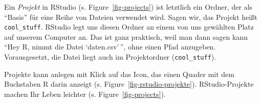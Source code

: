 \documentclass[
  letterpaper,
  DIV=11,
  numbers=noendperiod]{scrartcl}
\theoremstyle{definition}
\theoremstyle{definition}
\theoremstyle{definition}
\theoremstyle{remark}
\begin{document}
Ein \emph{Projekt} in RStudio (s. Figure~\ref{fig-projects}) ist
letztlich ein Ordner, der als ``Basis'' für eine Reihe von Dateien
verwendet wird. Sagen wir, das Projekt heißt \texttt{cool\_stuff}.
RStudio legt uns diesen Ordner an einem von uns gewählten Platz auf
unserem Computer an. Das ist ganz praktisch, weil man dann sagen kann
``Hey R, nimmt die Datei `daten.csv'\,'', ohne einen Pfad anzugeben.
Vorausgesetzt, die Datei liegt auch im Projektordner
(\texttt{cool\_stuff}).

Projekte kann anlegen mit Klick auf das Icon, das einen Quader mit dem
Buchstaben R darin anzeigt (s. Figure~\ref{fig-rstudio-projekte}).
RStudio-Projekte machen Ihr Leben leichter (s.
Figure~\ref{fig-projects}).

\begin{figure}

\begin{minipage}{0.50\linewidth}



\end{minipage}%
%
\begin{minipage}{0.50\linewidth}

\centering{

}
\end{minipage}
\end{figure}
\end{document}
